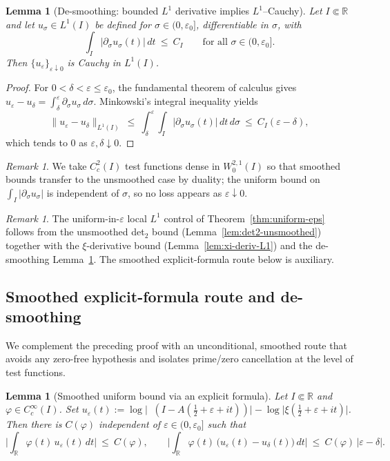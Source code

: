 \documentclass[11pt]{article}
\newtheorem{lemma}[theorem]{Lemma}
\theoremstyle{definition}
\theoremstyle{remark}
\newtheorem{remark}[theorem]{Remark}
\newcommand{\R}{\mathbb{R}}
\DeclareMathOperator{\dettwo}{det_2}
\begin{document}
\begin{lemma}[De-smoothing: bounded $L^1$ derivative implies $L^1$–Cauchy]\label{lem:desmoothing}
Let \(I\Subset\R\) and let \(u_\sigma\in L^1(I)\) be defined for \(\sigma\in(0,\varepsilon_0]\), differentiable in \(\sigma\), with
\[
  \int_I |\partial_\sigma u_\sigma(t)|\,dt\ \le\ C_I\qquad\text{for all }\sigma\in(0,\varepsilon_0].
\]
Then \(\{u_\varepsilon\}_{\varepsilon\downarrow 0}\) is Cauchy in $L^1(I)$.
\end{lemma}
\begin{proof}
For \(0<\delta<\varepsilon\le\varepsilon_0\), the fundamental theorem of calculus gives
\(u_\varepsilon-u_\delta=\int_\delta^\varepsilon \partial_\sigma u_\sigma\,d\sigma\).
Minkowski's integral inequality yields
\[
  \|u_\varepsilon-u_\delta\|_{L^1(I)}\ \le\ \int_\delta^\varepsilon \int_I |\partial_\sigma u_\sigma(t)|\,dt\,d\sigma\ \le\ C_I(\varepsilon-\delta),
\]
which tends to $0$ as \(\varepsilon,\delta\downarrow 0\).
\end{proof}
\begin{remark}
We take \(C_c^2(I)\) test functions dense in \(W^{2,1}_0(I)\) so that smoothed bounds transfer to the unsmoothed case by duality; the uniform bound on \(\int_I|\partial_\sigma u_\sigma|\) is independent of \(\sigma\), so no loss appears as \(\varepsilon\downarrow 0\).
\end{remark}
\begin{remark}
The uniform-in-\(\varepsilon\) local $L^1$ control of Theorem~\ref{thm:uniform-eps} follows from the unsmoothed det$_2$ bound (Lemma~\ref{lem:det2-unsmoothed}) together with the \(\xi\)-derivative bound (Lemma~\ref{lem:xi-deriv-L1}) and the de-smoothing Lemma~\ref{lem:desmoothing}. The smoothed explicit-formula route below is auxiliary.
\end{remark}

\subsection{Smoothed explicit-formula route and de-smoothing}\label{subsec:smoothed-explicit}
We complement the preceding proof with an unconditional, smoothed route that avoids any zero-free hypothesis and isolates prime/zero cancellation at the level of test functions.

\begin{lemma}[Smoothed uniform bound via an explicit formula]\label{lem:smoothed-explicit}
Let \(I\Subset\R\) and \(\varphi\in C_c^{\infty}(I)\). Set \(u_\varepsilon(t):=\log\big|\dettwo(I-A(\tfrac12+\varepsilon+it))\big|-\log\big|\xi(\tfrac12+\varepsilon+it)\big|\). Then there is \(C(\varphi)\) independent of \(\varepsilon\in(0,\varepsilon_0]\) such that
\[
 \Big|\int_{\R} \varphi(t)\,u_\varepsilon(t)\,dt\Big|\ \le\ C(\varphi),\qquad \Big|\int_{\R} \varphi(t)\,\big(u_\varepsilon(t)-u_\delta(t)\big)\,dt\Big|\ \le\ C(\varphi)\,|\varepsilon-\delta|.
\]
\end{lemma}
\end{document}
